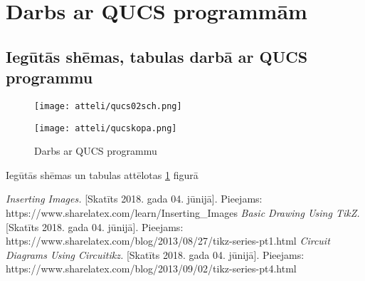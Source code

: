\documentclass{report}
\begin{document}
\section{Darbs ar QUCS programmām}

\subsection{Iegūtās shēmas, tabulas darbā ar QUCS programmu}
\begin{figure}[ht]
\caption{Darbs ar QUCS programmu}
\label{i:qucs}
\texttt{[image: atteli/qucs02sch.png]}

\texttt{[image: atteli/qucskopa.png]}
\end{figure}
Iegūtās shēmas un tabulas attēlotas \ref{i:qucs} figurā

\begin{thebibliography}{9}
\textit{Inserting Images.} [Skatīts 2018. gada 04. jūnijā].
Pieejams: 
https://www.sharelatex.com/learn/Inserting\_{}Images
\textit{Basic Drawing Using TikZ.} [Skatīts 2018. gada 04. jūnijā].
Pieejams: 
https://www.sharelatex.com/blog/2013/08/27/tikz-series-pt1.html
\textit{Circuit Diagrams Using Circuitikz.} [Skatīts 2018. gada 04. jūnijā].
Pieejams: 
https://www.sharelatex.com/blog/2013/09/02/tikz-series-pt4.html

 
\end{thebibliography}
\end{document}
